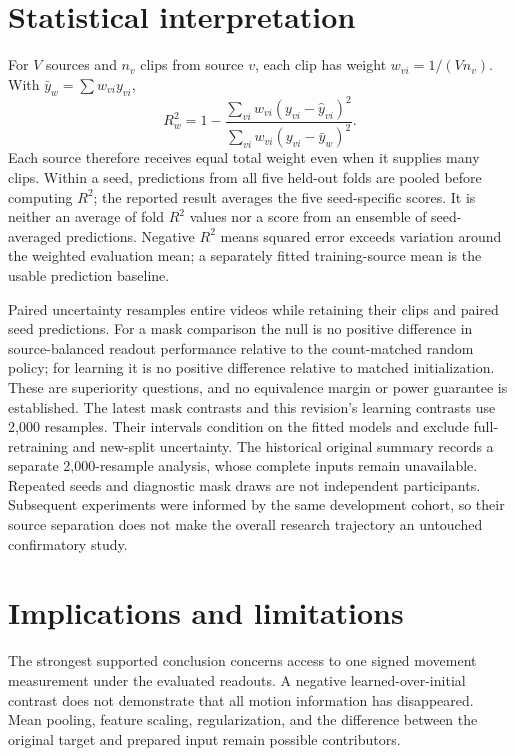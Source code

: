 \documentclass{article}
\begin{document}
\section{Statistical interpretation}\label{statistical-interpretation}

For \(V\) sources and \(n_v\) clips from source \(v\), each clip has weight \(w_{vi}=1/(Vn_v)\). With \(\bar y_w=\sum w_{vi}y_{vi}\), \[
R^2_w=1-\frac{\sum_{vi}w_{vi}(y_{vi}-\hat y_{vi})^2}
{\sum_{vi}w_{vi}(y_{vi}-\bar y_w)^2}.
\] Each source therefore receives equal total weight even when it supplies many clips. Within a seed, predictions from all five held-out folds are pooled before computing \(R^2\); the reported result averages the five seed-specific scores. It is neither an average of fold \(R^2\) values nor a score from an ensemble of seed-averaged predictions. Negative \(R^2\) means squared error exceeds variation around the weighted evaluation mean; a separately fitted training-source mean is the usable prediction baseline.

Paired uncertainty resamples entire videos while retaining their clips and paired seed predictions. For a mask comparison the null is no positive difference in source-balanced readout performance relative to the count-matched random policy; for learning it is no positive difference relative to matched initialization. These are superiority questions, and no equivalence margin or power guarantee is established. The latest mask contrasts and this revision's learning contrasts use 2,000 resamples. Their intervals condition on the fitted models and exclude full-retraining and new-split uncertainty. The historical original summary records a separate 2,000-resample analysis, whose complete inputs remain unavailable. Repeated seeds and diagnostic mask draws are not independent participants. Subsequent experiments were informed by the same development cohort, so their source separation does not make the overall research trajectory an untouched confirmatory study.

\section{Implications and limitations}\label{implications-and-limitations}

The strongest supported conclusion concerns access to one signed movement measurement under the evaluated readouts. A negative learned-over-initial contrast does not demonstrate that all motion information has disappeared. Mean pooling, feature scaling, regularization, and the difference between the original target and prepared input remain possible contributors.
\end{document}
